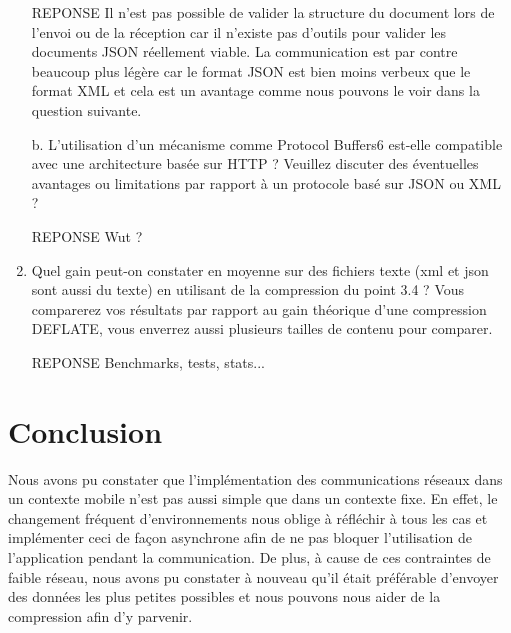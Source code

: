\documentclass[a4paper]{article}
\begin{document}
\begin{enumerate}
    REPONSE
    Il n'est pas possible de valider la structure du document lors de l'envoi ou de la réception car il n'existe pas d'outils pour valider les documents JSON réellement viable. La communication est par contre beaucoup plus légère car le format JSON est bien moins verbeux que le format XML et cela est un avantage comme nous pouvons le voir dans la question suivante.
    
    b. L’utilisation d’un mécanisme comme Protocol Buffers6 est-elle compatible avec une
    architecture basée sur HTTP ? Veuillez discuter des éventuelles avantages ou limitations par
    rapport à un protocole basé sur JSON ou XML ?
    
    REPONSE
    Wut ?
    
    \item Quel gain peut-on constater en moyenne sur des fichiers texte (xml et json sont aussi du texte) en utilisant de la compression du point 3.4 ? Vous comparerez vos résultats par rapport au gain théorique d’une compression DEFLATE, vous enverrez aussi plusieurs tailles de contenu pour comparer.
    
    REPONSE
    Benchmarks, tests, stats...
    
\end{enumerate}

\section{Conclusion}

Nous avons pu constater que l'implémentation des communications réseaux dans un contexte mobile n'est pas aussi simple que dans un contexte fixe. En effet, le changement fréquent d'environnements nous oblige à réfléchir à tous les cas et implémenter ceci de façon asynchrone afin de ne pas bloquer l'utilisation de l'application pendant la communication. De plus, à cause de ces contraintes de faible réseau, nous avons pu constater à nouveau qu'il était préférable d'envoyer des données les plus petites possibles et nous pouvons nous aider de la compression afin d'y parvenir.
\end{document}
